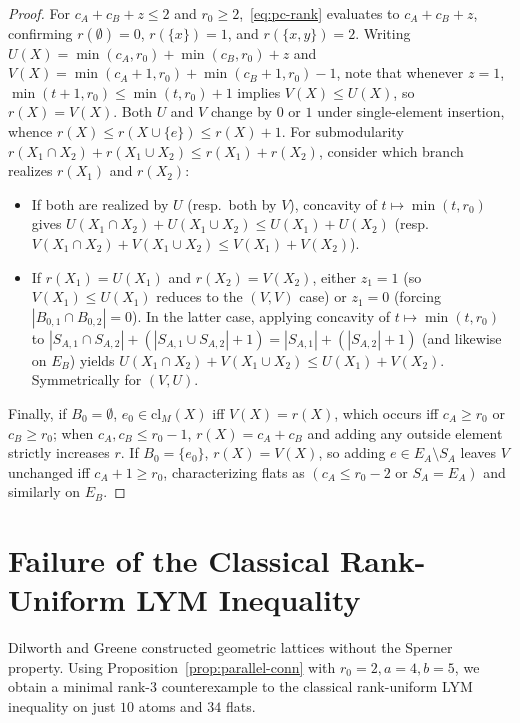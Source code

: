 \documentclass[11pt]{article}
\theoremstyle{definition}
\theoremstyle{remark}
\newcommand{\cl}{\mathrm{cl}}
\begin{document}
\begin{proof}
For $c_A + c_B + z \le 2$ and $r_0 \ge 2$,~\eqref{eq:pc-rank} evaluates to $c_A + c_B + z$, confirming $r(\emptyset) = 0$, $r(\{x\}) = 1$, and $r(\{x, y\}) = 2$. Writing $U(X) = \min(c_A, r_0) + \min(c_B, r_0) + z$ and $V(X) = \min(c_A + 1, r_0) + \min(c_B + 1, r_0) - 1$, note that whenever $z = 1$, $\min(t + 1, r_0) \le \min(t, r_0) + 1$ implies $V(X) \le U(X)$, so $r(X) = V(X)$. Both $U$ and $V$ change by $0$ or $1$ under single-element insertion, whence $r(X) \le r(X \cup \{e\}) \le r(X) + 1$. For submodularity $r(X_1 \cap X_2) + r(X_1 \cup X_2) \le r(X_1) + r(X_2)$, consider which branch realizes $r(X_1)$ and $r(X_2)$:
\begin{itemize}
\item If both are realized by $U$ (resp.\ both by $V$), concavity of $t \mapsto \min(t, r_0)$ gives $U(X_1 \cap X_2) + U(X_1 \cup X_2) \le U(X_1) + U(X_2)$ (resp.\ $V(X_1 \cap X_2) + V(X_1 \cup X_2) \le V(X_1) + V(X_2)$).
\item If $r(X_1) = U(X_1)$ and $r(X_2) = V(X_2)$, either $z_1 = 1$ (so $V(X_1) \le U(X_1)$ reduces to the $(V,V)$ case) or $z_1 = 0$ (forcing $|B_{0,1} \cap B_{0,2}| = 0$). In the latter case, applying concavity of $t \mapsto \min(t, r_0)$ to $|S_{A,1} \cap S_{A,2}| + (|S_{A,1} \cup S_{A,2}| + 1) = |S_{A,1}| + (|S_{A,2}| + 1)$ (and likewise on $E_B$) yields $U(X_1 \cap X_2) + V(X_1 \cup X_2) \le U(X_1) + V(X_2)$. Symmetrically for $(V, U)$.
\end{itemize}
Finally, if $B_0 = \emptyset$, $e_0 \in \cl_M(X)$ iff $V(X) = r(X)$, which occurs iff $c_A \ge r_0$ or $c_B \ge r_0$; when $c_A, c_B \le r_0 - 1$, $r(X) = c_A + c_B$ and adding any outside element strictly increases $r$. If $B_0 = \{e_0\}$, $r(X) = V(X)$, so adding $e \in E_A \setminus S_A$ leaves $V$ unchanged iff $c_A + 1 \ge r_0$, characterizing flats as $(c_A \le r_0 - 2 \text{ or } S_A = E_A)$ and similarly on $E_B$.
\end{proof}

\section{Failure of the Classical Rank-Uniform LYM Inequality}

Dilworth and Greene \cite{DilworthGreene1971} constructed geometric lattices without the Sperner property. Using Proposition~\ref{prop:parallel-conn} with $r_0 = 2, a = 4, b = 5$, we obtain a minimal rank-$3$ counterexample to the classical rank-uniform LYM inequality on just $10$ atoms and $34$ flats.
\end{document}
